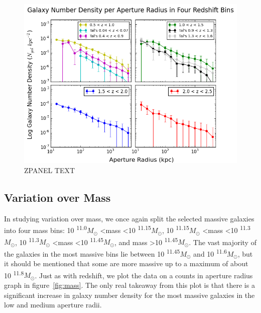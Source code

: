 \documentclass[apj]{emulateapj}
\begin{document}
\begin{figure}
\centering
\graphicspath{{C:/3d_hst/2015_finals/aperture_distance/}}
\includegraphics[width=\linewidth]{temp_zpanel_final}
\caption{\footnotesize ZPANEL TEXT}
\label{fig:zpanel}
\end{figure}

\subsection{Variation over Mass}

In studying variation over mass, we once again split the selected massive galaxies into four mass bins: 10 \textsuperscript{11.0}$M_{\odot}$ \textless mass \textless 10 \textsuperscript{11.15}$M_{\odot}$, 10 \textsuperscript{11.15}$M_{\odot}$ \textless mass \textless 10 \textsuperscript{11.3}$M_{\odot}$, 10 \textsuperscript{11.3}$M_{\odot}$ \textless mass \textless 10 \textsuperscript{11.45}$M_{\odot}$, and mass \textgreater 10 \textsuperscript{11.45}$M_{\odot}$. The vast majority of the galaxies in the most massive bins lie between 10 \textsuperscript{11.45}$M_{\odot}$ and 10 \textsuperscript{11.6}$M_{\odot}$, but it should be mentioned that some are more massive up to a maximum of about 10 \textsuperscript{11.8}$M_{\odot}$. Just as with redshift, we plot the data on a counts in aperture radius graph in figure~\ref{fig:mass}. The only real takeaway from this plot is that there is a significant increase in galaxy number density for the most massive galaxies in the low and medium aperture radii.
\end{document}
